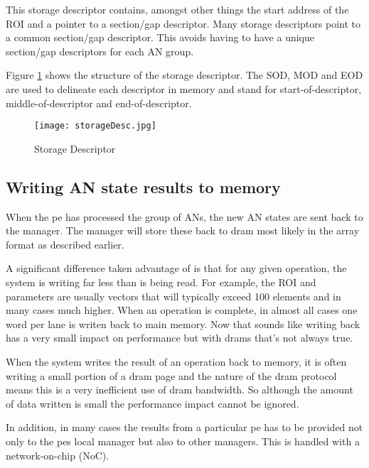 This storage descriptor contains, amongst other things the start address of the ROI and a pointer to a section/gap descriptor. Many storage descriptors point to a common section/gap descriptor. This avoids having to have a unique section/gap descriptors for each AN group.

Figure \ref{fig:storageDescriptor} shows the structure of the storage descriptor. The SOD, MOD and EOD are used to delineate each descriptor in memory and stand for start-of-descriptor, middle-of-descriptor and end-of-descriptor.

\begin{figure}[!t]
\centering
\captionsetup{justification=centering}
\captionsetup{width=.9\linewidth}
\centerline{
\mbox{\texttt{[image: storageDesc.jpg]}}
}
\caption{Storage Descriptor}
\label{fig:storageDescriptor}
\end{figure}

\subsection{Writing AN state results to memory}
\label{ssec:writingANStates}

When the \ac{pe} has processed the group of ANs, the new AN states are sent back to the manager. The manager will store these back to \ac{dram} most likely in the array format as described earlier.

A significant difference taken advantage of is that for any given operation, the system is writing far less than is being read. For example, the ROI and parameters are usually vectors that will typically exceed 100 elements and in many cases much higher. When an operation is complete, in almost all cases one word per lane is writen back to main memory. 
Now that sounds like writing back has a very small impact on performance but with \ac{dram}s that's not always true.

When the system writes the result of an operation back to memory, it is often writing a small portion of a \ac{dram} page and the nature of the \ac{dram} protocol means this is a very inefficient use of \ac{dram} bandwidth. So although the amount of data written is small the performance impact cannot be ignored.

In addition, in many cases the results from a particular \ac{pe} has to be provided not only to the \ac{pe}s local manager but also to other managers. This is handled with a network-on-chip (NoC).

